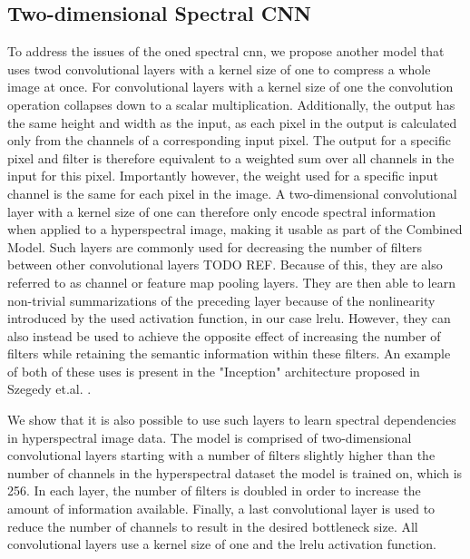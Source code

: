 \subsection{Two-dimensional Spectral CNN\label{sec:fastconv1d}}
To address the issues of the \ac{oned} spectral \ac{cnn}, we propose another model that uses \ac{twod} convolutional layers with a kernel size of one to compress a whole image at once. For convolutional layers with a kernel size of one the convolution operation collapses down to a scalar multiplication. Additionally, the output has the same height and width as the input, as each pixel in the output is calculated only from the channels of a corresponding input pixel. The output for a specific pixel and filter is therefore equivalent to a weighted sum over all channels in the input for this pixel. Importantly however, the weight used for a specific input channel is the same for each pixel in the image. A two-dimensional convolutional layer with a kernel size of one can therefore only encode spectral information when applied to a hyperspectral image, making it usable as part of the Combined Model. Such layers are commonly used for decreasing the number of filters between other convolutional layers TODO REF. Because of this, they are also referred to as channel or feature map pooling layers. They are then able to learn non-trivial summarizations of the preceding layer because of the nonlinearity introduced by the used activation function, in our case \ac{lrelu}. However, they can also instead be used to achieve the opposite effect of increasing the number of filters while retaining the semantic information within these filters. An example of both of these uses is present in the "Inception" architecture proposed in Szegedy et.al. \citep{szegedy_going_2014}.

We show that it is also possible to use such layers to learn spectral dependencies in hyperspectral image data. The model is comprised of two-dimensional convolutional layers starting with a number of filters slightly higher than the number of channels in the hyperspectral dataset the model is trained on, which is 256. In each layer, the number of filters is doubled in order to increase the amount of information available. Finally, a last convolutional layer is used to reduce the number of channels to result in the desired bottleneck size. All convolutional layers use a kernel size of one and the \ac{lrelu} activation function.

